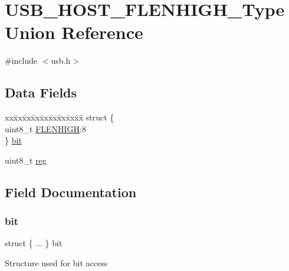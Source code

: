 \hypertarget{union_u_s_b___h_o_s_t___f_l_e_n_h_i_g_h___type}{}\section{U\+S\+B\+\_\+\+H\+O\+S\+T\+\_\+\+F\+L\+E\+N\+H\+I\+G\+H\+\_\+\+Type Union Reference}
\label{union_u_s_b___h_o_s_t___f_l_e_n_h_i_g_h___type}


{\ttfamily \#include $<$usb.\+h$>$}

\subsection*{Data Fields}
\begin{DoxyCompactItemize}
\item 
\begin{tabbing}
xx\=xx\=xx\=xx\=xx\=xx\=xx\=xx\=xx\=\kill
struct \{\\
\>uint8\_t \mbox{\hyperlink{union_u_s_b___h_o_s_t___f_l_e_n_h_i_g_h___type_af2ea2d0469b1f435850080c42ff40306}{FLENHIGH}}:8\\
\} \mbox{\hyperlink{union_u_s_b___h_o_s_t___f_l_e_n_h_i_g_h___type_a6c1f7341ad4649af2688e6061a6135c3}{bit}}\\

\end{tabbing}\item 
uint8\+\_\+t \mbox{\hyperlink{union_u_s_b___h_o_s_t___f_l_e_n_h_i_g_h___type_a9428adc9af4653a2050e2536b55dec8d}{reg}}
\end{DoxyCompactItemize}


\subsection{Field Documentation}
\mbox{\label{union_u_s_b___h_o_s_t___f_l_e_n_h_i_g_h___type_a6c1f7341ad4649af2688e6061a6135c3}} 
\subsubsection{\texorpdfstring{bit}{bit}}
{\footnotesize\ttfamily struct \{ ... \}   bit}

Structure used for bit access \mbox{\label{union_u_s_b___h_o_s_t___f_l_e_n_h_i_g_h___type_af2ea2d0469b1f435850080c42ff40306}} 
